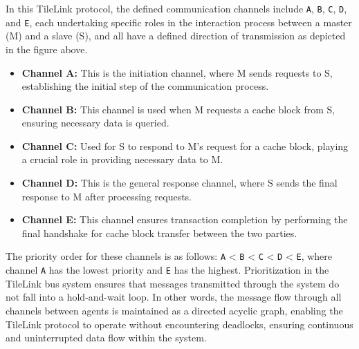 In this TileLink protocol, the defined communication channels include \texttt{A}, \texttt{B}, \texttt{C}, \texttt{D}, and \texttt{E}, each undertaking specific roles in the interaction process between a master (M) and a slave (S), and all have a defined direction of transmission as depicted in the figure above.
\begin{itemize}
    \item \textbf{Channel A:} This is the initiation channel, where M sends requests to S, establishing the initial step of the communication process.
    \item \textbf{Channel B:} This channel is used when M requests a cache block from S, ensuring necessary data is queried.
    \item \textbf{Channel C:} Used for S to respond to M's request for a cache block, playing a crucial role in providing necessary data to M.
    \item \textbf{Channel D:} This is the general response channel, where S sends the final response to M after processing requests.
    \item \textbf{Channel E:} This channel ensures transaction completion by performing the final handshake for cache block transfer between the two parties.
\end{itemize}

The priority order for these channels is as follows: \texttt{A} < \texttt{B} < \texttt{C} < \texttt{D} < \texttt{E}, where channel \texttt{A} has the lowest priority and \texttt{E} has the highest. Prioritization in the TileLink bus system ensures that messages transmitted through the system do not fall into a hold-and-wait loop. In other words, the message flow through all channels between agents is maintained as a directed acyclic graph, enabling the TileLink protocol to operate without encountering deadlocks, ensuring continuous and uninterrupted data flow within the system.


